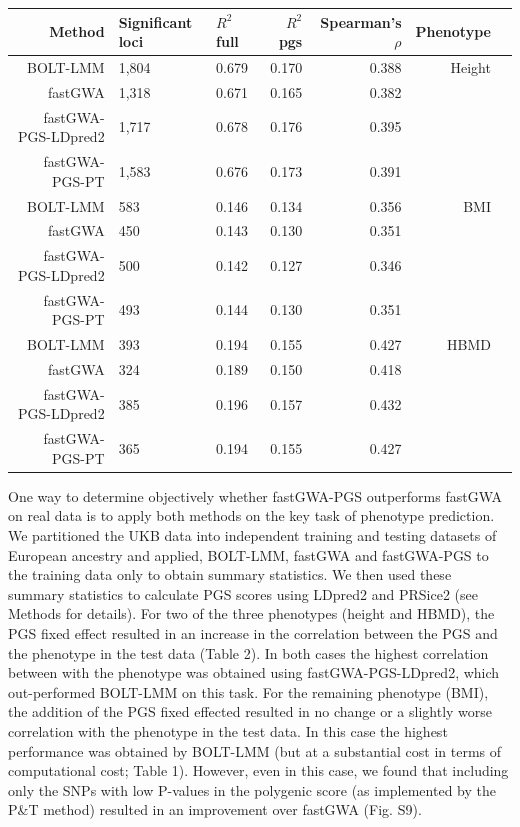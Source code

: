 \documentclass[fleqn,10pt]{wlscirep}
\begin{document}
\begin{table}[ht]
\centering
{}
\begin{tabular}{rLLrrrr}
  \hline
 Method & Significant loci & $R^2$ full & $R^2$ pgs & Spearman's $\rho$ & Phenotype \\ 
 \hline 
   BOLT-LMM & 1,804  & 0.679 & 0.170 & 0.388 & Height \\ 
  fastGWA & 1,318  & 0.671 & 0.165 & 0.382  &\\ 
  fastGWA-PGS-LDpred2 & 1,717  & 0.678 & 0.176 & 0.395 &\\ 
  fastGWA-PGS-PT & 1,583  & 0.676 & 0.173 & 0.391 & \\ 
  \hline
BOLT-LMM & 583  & 0.146 & 0.134 & 0.356 & BMI \\ 
  fastGWA & 450  & 0.143 & 0.130 & 0.351 &\\ 
  fastGWA-PGS-LDpred2 & 500  & 0.142 & 0.127 & 0.346 &\\ 
  fastGWA-PGS-PT & 493 & 0.144 & 0.130 & 0.351 &\\ 
  \hline
  BOLT-LMM & 393  & 0.194 & 0.155 & 0.427 & HBMD \\ 
  fastGWA & 324  & 0.189 & 0.150 & 0.418 &\\ 
  fastGWA-PGS-LDpred2 & 385  & 0.196 & 0.157 & 0.432 &\\ 
  fastGWA-PGS-PT & 365  & 0.194 & 0.155 & 0.427 & \\ 
 \hline
\end{tabular}
\end{table}


One way to determine objectively whether fastGWA-PGS outperforms fastGWA on real data is to apply both methods on the key task of phenotype prediction. We partitioned the UKB data into independent training and testing datasets of European ancestry and applied, BOLT-LMM, fastGWA and fastGWA-PGS to the training data only to obtain summary statistics. We then 
used these summary statistics to calculate PGS scores using LDpred2 and PRSice2 (see Methods for details). For two of the three phenotypes (height and HBMD), the PGS fixed effect resulted in an increase in the correlation between the PGS and the phenotype in the test data (Table 2). In both cases the highest correlation between with the phenotype was obtained using fastGWA-PGS-LDpred2, which out-performed BOLT-LMM on this task. For the remaining phenotype (BMI), the addition of the PGS fixed effected resulted in no change or a slightly worse correlation with the phenotype in the test data. In this case the highest performance was obtained by BOLT-LMM (but at a substantial cost in terms of computational cost; Table 1). However, even in this case, we found that including only the SNPs with low P-values in the polygenic score (as implemented by the P\&T method) resulted in an improvement over fastGWA (Fig. S9).
 
\end{document}
